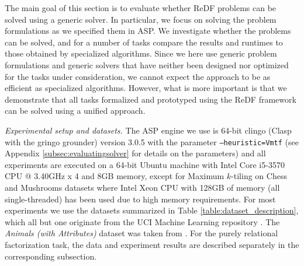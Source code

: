 
\begin{table}[b]
 \caption{Dataset properties. For each dataset,  we specify whether the attributes have Boolean or categorical domains, the number of tuples and attributes, and the average number of distinct values per attribute}
 \label{table:dataset_description}
\end{table}

The main goal of this section is to evaluate whether ReDF problems can be solved using a generic solver. In particular, we focus on solving the problem formulations as we specified them in ASP. We investigate whether the problems can be solved, and for a number of tasks compare the results and runtimes to those obtained by specialized algorithms. Since we here use generic problem formulations and generic solvers that have neither been designed nor optimized for the tasks under consideration, we cannot expect the approach to be as efficient as specialized algorithms. However, what is more important is that we demonstrate that all tasks formalized and prototyped using the ReDF framework can be solved using a unified approach.


\textit{Experimental setup and datasets.} The ASP engine we use is 64-bit clingo (Clasp with the gringo grounder) version 3.0.5 with the parameter \texttt{--heuristic=Vmtf} (see Appendix \ref{subsec:evaluatingsolver} for details on the parameters) and all experiments are executed on a 64-bit Ubuntu machine with Intel Core i5-3570 CPU @ 3.40GHz x 4 and 8GB memory, except for Maximum $k$-tiling on Chess and Mushrooms datasets where Intel Xeon CPU with 128GB of memory (all single-threaded) has been used due to high memory requirements. For most experiments we use the datasets summarized in Table \ref{table:dataset_description}, which all but one originate from the UCI Machine Learning repository \parencite{ucidatasets}. The \emph{Animals (with Attributes)} dataset was taken from \cite{animalDataset}. For the purely relational factorization task, the data and experiment results are described separately in the corresponding subsection. 


